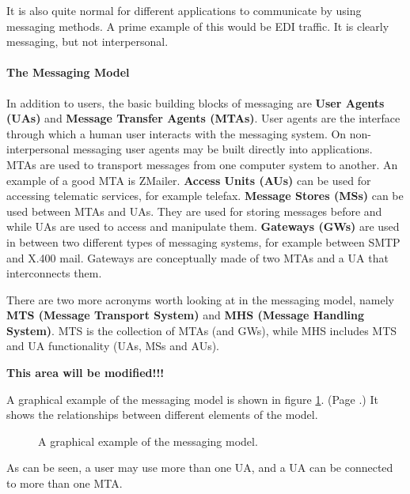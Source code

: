 It is also quite normal for different applications to communicate by using
messaging methods.
A prime example of this would be EDI traffic. It is clearly messaging,
but not interpersonal.



\paragraph{The Messaging Model}

In addition to users, the basic building blocks of messaging are
{\bf User Agents (UAs)} and {\bf Message Transfer Agents (MTAs)}.
User agents are the interface through which a human user interacts with
the messaging system.
On non-interpersonal messaging user agents may be built directly into
applications.
MTAs are used to transport messages from one computer system to another.
An example of a good MTA is ZMailer. 
{\bf Access Units (AUs)} can be used for accessing telematic services,
for example telefax. 
{\bf Message Stores (MSs)} can be used between MTAs and UAs.
They are used for storing messages before and while UAs are used
to access and manipulate them.
{\bf Gateways (GWs)} are used in between two different types
of messaging systems, for example between SMTP and X.400 mail.
Gateways are conceptually made of two MTAs and a UA that interconnects them.

There are two more acronyms worth looking at in the messaging model,
namely {\bf MTS (Message Transport System)} and
{\bf MHS (Message Handling System)}.
MTS is the collection of MTAs (and GWs),
while MHS includes MTS and UA functionality (UAs, MSs and AUs).

{\bf This area will be modified!!!}



A graphical example of the messaging model is shown in figure 
\ref{fig:msgmodl}.
(Page \pageref{fig:msgmodl}.)
It shows the relationships between different elements of the model.

\begin{figure}[ht]
  \caption{\label{fig:msgmodl}A graphical example of the messaging model.}
\end{figure}


As can be seen, a user may use more than one UA, and a UA can be connected 
to more than one MTA.

